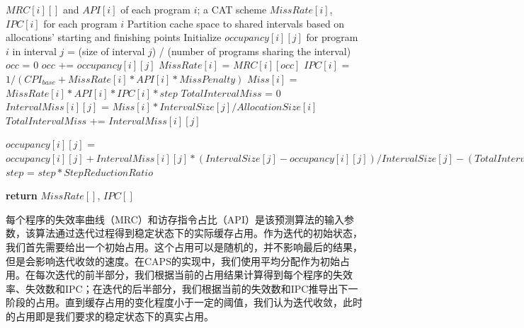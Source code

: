 \begin{algorithm}
\caption{预测算法伪代码}
\label{alg:pred}
\begin{algorithmic}[1]
\renewcommand{\algorithmicforall}{\textbf{foreach}}
\renewcommand{\algorithmicrequire}{\textbf{Input:}}
\renewcommand{\algorithmicensure}{\textbf{Output:}}
\REQUIRE $MRC[i][]$ and $API[i]$ of each program $i$; a CAT scheme
\ENSURE $MissRate[i]$, $IPC[i]$ for each program $i$
\STATE Partition cache space to shared intervals based on allocations' starting and finishing points
\STATE Initialize $occupancy[i][j]$ for program $i$ in interval $j$ = (size of interval $j$) / (number of programs sharing the interval)
    	\STATE $occ$ = $0$
			\STATE $occ$ += $occupancy[i][j]$
        \ENDFOR
        \STATE $MissRate[i]$ = $MRC[i][occ]$
        \STATE $IPC[i]$ = $1 / (CPI_{base} + MissRate[i] * API[i] * MissPenalty)$
        \STATE $Miss[i]$ = $MissRate[i] * API[i] * IPC[i] * step$
    \ENDFOR
    	\STATE $TotalIntervalMiss$ = $0$
        	\STATE $IntervalMiss[i][j]$ = $Miss[i] * IntervalSize[j] / AllocationSize[i]$
            \STATE $TotalIntervalMiss$ += $IntervalMiss[i][j]$ 
		\ENDFOR
        
        	\STATE $occupancy[i][j]$ =  $occupancy[i][j] + IntervalMiss[i][j] * (IntervalSize[j] - occupancy[i][j]) / IntervalSize[j] - (TotalIntervalMiss - IntervalMiss[i][j]) * occupancy[i][j] / IntervalSize[j]$
		\ENDFOR
    \ENDFOR
    	\STATE $step$ = $step * StepReductionRatio$
    \ENDIF
\ENDWHILE

\STATE \textbf{return} $MissRate[]$, $IPC[]$

\end{algorithmic}
\end{algorithm}

每个程序的失效率曲线（MRC）和访存指令占比（API）是该预测算法的输入参数，该算法通过迭代过程得到稳定状态下的实际缓存占用。作为迭代的初始状态，我们首先需要给出一个初始占用。这个占用可以是随机的，并不影响最后的结果，但是会影响迭代收敛的速度。在CAPS的实现中，我们使用平均分配作为初始占用。在每次迭代的前半部分，我们根据当前的占用结果计算得到每个程序的失效率、失效数和IPC；在迭代的后半部分，我们根据当前的失效数和IPC推导出下一阶段的占用。直到缓存占用的变化程度小于一定的阈值，我们认为迭代收敛，此时的占用即是我们要求的稳定状态下的真实占用。

